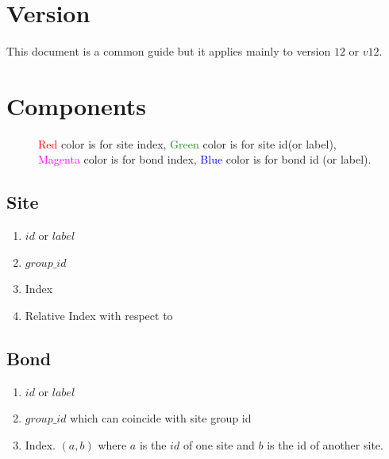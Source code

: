 \documentclass[10pt,a4paper]{report}
\begin{document}
	\chapter{Version}
	This document is a common guide but it applies mainly to version $12$ or $v12$.
	
	\chapter{Components}
	\begin{figure}
		\caption{\textcolor{red}{Red} color is for site index, \textcolor{ForestGreen}{Green} color is for site id(or label), \textcolor{magenta}{Magenta} color is for bond index, \textcolor{blue}{Blue} color is for bond id (or label).}
	\end{figure}
	\section{Site}
	\begin{enumerate}
		\item $id$ or $label$
		\item $group\_id$
		\item Index
		\item Relative Index with respect to 
	\end{enumerate}
	\section{Bond}
\begin{enumerate}
	\item $id$ or $label$
	\item $group\_id$ which can coincide with site group id
	
	\item Index. $(a,b)$ where $a$ is the $id$ of one site and $b$ is the id of another site.
\end{enumerate}
\newpage
\end{document}
